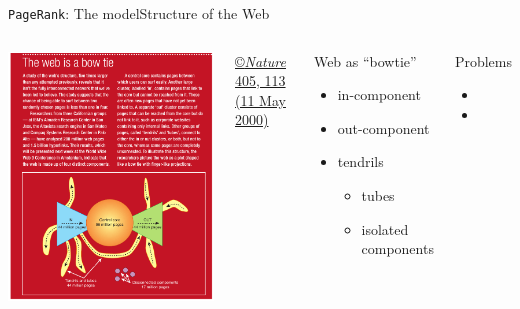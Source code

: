 \documentclass[xcolor=table,final]{beamer} %
\newcommand{\PageRank}{\texttt{PageRank}\xspace}
\begin{document}
\begin{frame}{\PageRank : The model}{Structure of the Web}
  \begin{columns}
    \includegraphics[width=1.\textwidth]{figs/pdf/BowTieExtract}%

    \href{http://www.nature.com/nature/journal/v405/n6783/pdf/405113a0.pdf}{\tiny \copyright \underline{\textit{Nature}} 405, 113 (11 May \underline{2000})}

    \begin{block}{Web as ``bowtie''}
      \begin{itemize}
      \item in-component
      \item out-component
      \item tendrils
        \begin{itemize}
        \item tubes
        \item isolated components
        \end{itemize}
      \end{itemize}
    \end{block}

    \pause
    \begin{block}{\alert{Problems}}
      \begin{itemize}
      \item {} %
      \item {} %
      \end{itemize}
    \end{block}
  \end{columns}
\end{frame}
\end{document}
